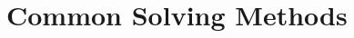 \documentclass[../complete.tex]{subfiles}
\begin{document}
\section{Common Solving Methods}
\end{document}
